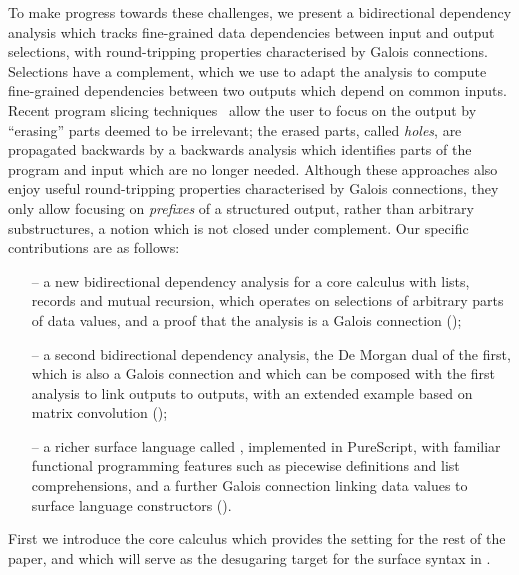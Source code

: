 To make progress towards these challenges, we present a bidirectional dependency analysis which tracks fine-grained data dependencies between input and output selections, with round-tripping properties characterised by Galois connections. Selections have a complement, which we use to adapt the analysis to compute fine-grained dependencies between two outputs which depend on common inputs. Recent program slicing techniques~\cite{perera12a,perera13a,ricciotti17} allow the user to focus on the output by ``erasing'' parts deemed to be irrelevant; the erased parts, called \emph{holes}, are propagated backwards by a backwards analysis which identifies parts of the program and input which are no longer needed. Although these approaches also enjoy useful round-tripping properties characterised by Galois connections, they only allow focusing on \emph{prefixes} of a structured output, rather than arbitrary substructures, a notion which is not closed under complement. Our specific contributions are as follows:

\begin{itemize}
   \item[--] a new bidirectional dependency analysis for a core calculus with lists, records and mutual recursion, which operates on selections of arbitrary parts of data values, and a proof that the analysis is a Galois connection ();
   \item[--] a second bidirectional dependency analysis, the De Morgan dual of the first, which is also a Galois connection and which can be composed with the first analysis to link outputs to outputs, with an extended example based on matrix convolution  ();
   \item[--] a richer surface language called \OurLanguage, implemented in PureScript, with familiar functional programming features such as piecewise definitions and list comprehensions, and a further Galois connection linking data values to surface language constructors ().
\end{itemize}

\noindent First we introduce the core calculus which provides the setting for the rest of the paper, and which will serve as the desugaring target for the surface syntax in .
